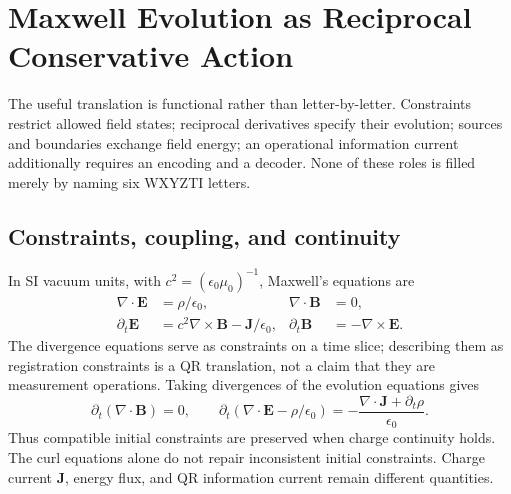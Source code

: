 \begingroup
\renewcommand{\thesection}{37C}
\section{Maxwell Evolution as Reciprocal Conservative Action}\label{sec:maxwelltranslation}
The useful translation is functional rather than letter-by-letter. Constraints restrict allowed field states; reciprocal derivatives specify their evolution; sources and boundaries exchange field energy; an operational information current additionally requires an encoding and a decoder. None of these roles is filled merely by naming six WXYZTI letters.

\subsection{Constraints, coupling, and continuity}
In SI vacuum units, with $c^2=(\epsilon_0\mu_0)^{-1}$, Maxwell's equations are \citep{feynmanmaxwell}
\begin{equation}
\begin{aligned}
\nabla\cdot\mathbf E&=\rho/\epsilon_0,&
\nabla\cdot\mathbf B&=0,\\
\partial_t\mathbf E&=c^2\nabla\times\mathbf B-\mathbf J/\epsilon_0,&
\partial_t\mathbf B&=-\nabla\times\mathbf E.
\end{aligned}
\tag{EM1}\label{eq:maxwelltranslation}
\end{equation}
The divergence equations serve as constraints on a time slice; describing them as registration constraints is a QR translation, not a claim that they are measurement operations. Taking divergences of the evolution equations gives
\begin{equation}
\partial_t(\nabla\cdot\mathbf B)=0,\qquad
\partial_t(\nabla\cdot\mathbf E-\rho/\epsilon_0)
=-\frac{\nabla\cdot\mathbf J+\partial_t\rho}{\epsilon_0}.
\tag{EM2}\label{eq:maxwellconstraints}
\end{equation}
Thus compatible initial constraints are preserved when charge continuity holds. The curl equations alone do not repair inconsistent initial constraints. Charge current $\mathbf J$, energy flux, and QR information current remain different quantities.

